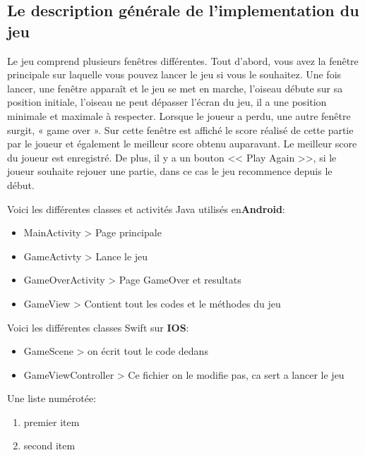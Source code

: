 \documentclass{article}
\begin{document}
\subsection{ Le description générale de l'implementation du jeu}

Le jeu comprend plusieurs fenêtres différentes. 
Tout d’abord, vous avez la fenêtre principale sur laquelle vous pouvez lancer le jeu si vous le souhaitez. 
Une fois lancer, une fenêtre apparaît et le jeu se met en marche, l'oiseau débute sur sa position initiale, l’oiseau ne peut dépasser l’écran du jeu, il a une position minimale et maximale à respecter. Lorsque le joueur a perdu, une autre fenêtre surgit, « game over ». Sur cette fenêtre est affiché le score réalisé de cette partie par le joueur et également le meilleur score obtenu auparavant.  
Le meilleur score du joueur est enregistré. 
De plus, il y a un bouton << Play Again >>, si le joueur souhaite rejouer une partie, dans ce cas le jeu recommence depuis le début.




Voici les différentes classes et activités Java utilisés en\textbf{Android}:
\begin{itemize}

\medskip
\item MainActivity > Page principale
\item GameActivty > Lance le jeu
\item GameOverActivity > Page GameOver et resultats
\item GameView > Contient tout les codes et le méthodes du jeu
\end{itemize}

\medskip

Voici les différentes classes Swift sur \textbf{IOS}:
\medskip

\begin{itemize}
    \item GameScene > on écrit tout le code dedans
    \item GameViewController > Ce fichier on le modifie pas, ca sert a lancer le jeu
\end{itemize}

Une liste numérotée:
\begin{enumerate}
\item premier item
\item second item
\end{enumerate}
\end{document}
